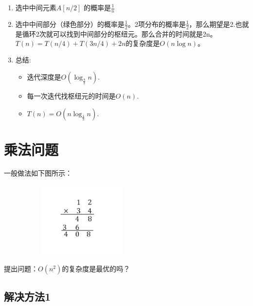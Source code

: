 \begin{enumerate}
\item 选中中间元素$A[n/2]$ 的概率是$ \frac{1}{n}$
\item 选中中间部分（绿色部分）的概率是$ \frac{1}{2}$。2项分布的概率是$ \frac{1}{2}$，那么期望是2.也就是循环2次就可以找到中间部分的枢纽元。那么合并的时间就是2n。$T(n) = T(n/4)+T(3n/4)+2n$的复杂度是$O(n\log n)$。
\item 总结: 
	\begin{itemize} 
 \item 迭代深度是$O( \log_{ \frac{4}{3}} n )$.
 \item 每一次迭代找枢纽元的时间是$O(n)$. 
\item  $T(n) = O(n \log_{\frac{4}{3}} n )$.
	\end{itemize}
\end{enumerate}

\section{乘法问题}
一般做法如下图所示：
\begin{figure}[H]
\centering
 \includegraphics[width=2.5in,height=1.5in] {multiply.png}
		
\end{figure}
提出问题：$O(n^2)$的复杂度是最优的吗？


\subsection{解决方法1}

